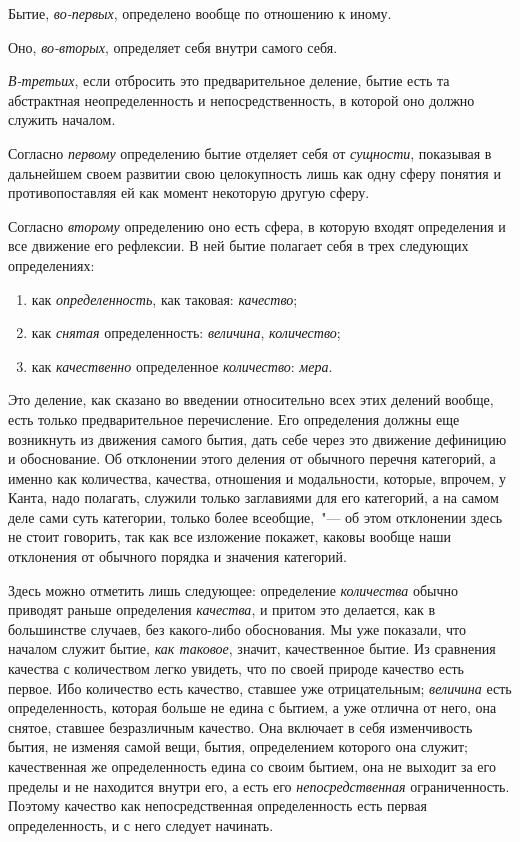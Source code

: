 Бытие, \emph{во-первых}, определено вообще по отношению
к иному.

Оно, \emph{во-вторых}, определяет себя внутри самого себя.

\emph{В-третьих}, если отбросить это предварительное деление,
бытие есть та абстрактная неопределенность и непосредственность,
в которой оно должно служить началом.


Согласно \emph{первому} определению бытие отделяет себя
от \emph{сущности}, показывая в дальнейшем своем развитии
свою целокупность лишь как одну сферу понятия и
противопоставляя ей как момент некоторую другую
сферу.

Согласно \emph{второму} определению оно есть сфера, в которую
входят определения и все движение его рефлексии.
В ней бытие полагает себя в трех следующих определениях:
\begin{enumerate}[label=\Roman*.]
\item как \emph{определенность}, как таковая: \emph{качество};
\item как \emph{снятая} определенность: \emph{величина}, \emph{количество};
\item как \emph{качественно} определенное \emph{количество}: \emph{мера}.
\end{enumerate}

Это деление, как сказано во введении относительно
всех этих делений вообще, есть только предварительное
перечисление. Его определения должны еще возникнуть
из движения самого бытия, дать себе через это движение
дефиницию и обоснование. Об отклонении этого деления
от обычного перечня категорий, а именно как количества,
качества, отношения и модальности, которые, впрочем,
у Канта, надо полагать, служили только заглавиями
для его категорий, а на самом деле сами суть категории,
только более всеобщие,~"--- об этом отклонении здесь не стоит
говорить, так как все изложение покажет, каковы вообще
наши отклонения от обычного порядка и значения категорий.


Здесь можно отметить лишь следующее: определение
\emph{количества} обычно приводят раньше определения \emph{качества},
и притом это делается, как в большинстве случаев,
без какого-либо обоснования. Мы уже показали, что началом
служит бытие, \emph{как таковое}, значит, качественное
бытие. Из сравнения качества с количеством легко увидеть,
что по своей природе качество есть первое. Ибо
количество есть качество, ставшее уже отрицательным;
\emph{величина} есть определенность, которая больше не едина
с бытием, а уже отлична от него, она снятое, ставшее
безразличным качество. Она включает в себя изменчивость
бытия, не изменяя самой вещи, бытия, определением
которого она служит; качественная же определенность
едина со своим бытием, она не выходит за его
пределы и не находится внутри его, а есть его \emph{непосредственная}
ограниченность. Поэтому качество как непосредственная
определенность есть первая определенность,
и с него следует начинать.

